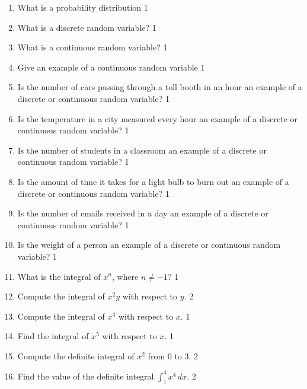 \documentclass[a4paper,oneside]{book}
\begin{document}
  \begin{enumerate}

\item What is a probability distribution \hfill 1
\item What is a discrete random variable? \hfill 1

\item What is a continuous random variable? \hfill 1

\item Give an example of a continuous random variable \hfill 1

\item Is the number of cars passing through a toll booth in an hour an example of a discrete or continuous random variable? \hfill 1

\item Is the temperature in a city measured every hour an example of a discrete or continuous random variable? \hfill 1

\item Is the number of students in a classroom an example of a discrete or continuous random variable? \hfill 1

\item Is the amount of time it takes for a light bulb to burn out an example of a discrete or continuous random variable? \hfill 1

\item Is the number of emails received in a day an example of a discrete or continuous random variable? \hfill 1

\item Is the weight of a person an example of a discrete or continuous random variable? \hfill 1

\item What is the integral of \( x^n \), where \( n \neq -1 \)? \hfill 1
\item Compute the integral of \( x^2y \) with respect to \( y \). \hfill 2
\item Compute the integral of \( x^3 \) with respect to \( x \). \hfill 1

\item Find the integral of \( x^5 \) with respect to \( x \). \hfill 1

\item Compute the definite integral of \( x^2 \) from 0 to 3. \hfill 2

\item Find the value of the definite integral \( \int_1^4 x^4 \, dx \). \hfill 2


\end{enumerate}
\end{document}
